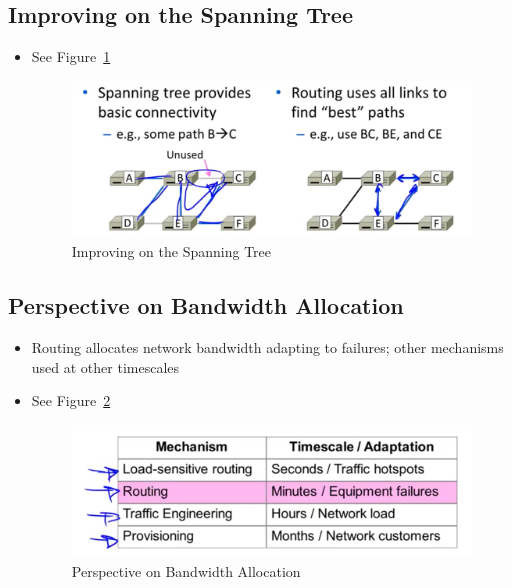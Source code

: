 \documentclass[12pt]{ctexart}   %
\begin{document}
	\subsection{Improving on the Spanning Tree}
	\begin{itemize}
		\item See Figure~\ref{fig:5-1-2}
		
		\begin{figure}[h!] %
		\centering
		 \includegraphics[scale=0.7]{images/5-1-2}
		\caption{ Improving on the Spanning Tree}
		 \label{fig:5-1-2}
		 \end{figure}
	\end{itemize}
	
	\subsection{Perspective on Bandwidth Allocation}
	\begin{itemize}
		\item Routing allocates network bandwidth adapting to failures; other mechanisms used at other timescales
		\item See Figure~\ref{fig:5-1-3}
		
		\begin{figure}[h!] %
		\centering
		 \includegraphics[scale=0.7]{images/5-1-3}
		\caption{ Perspective on Bandwidth Allocation }
		 \label{fig:5-1-3}
		 \end{figure}
	\end{itemize}
	
\end{document}
